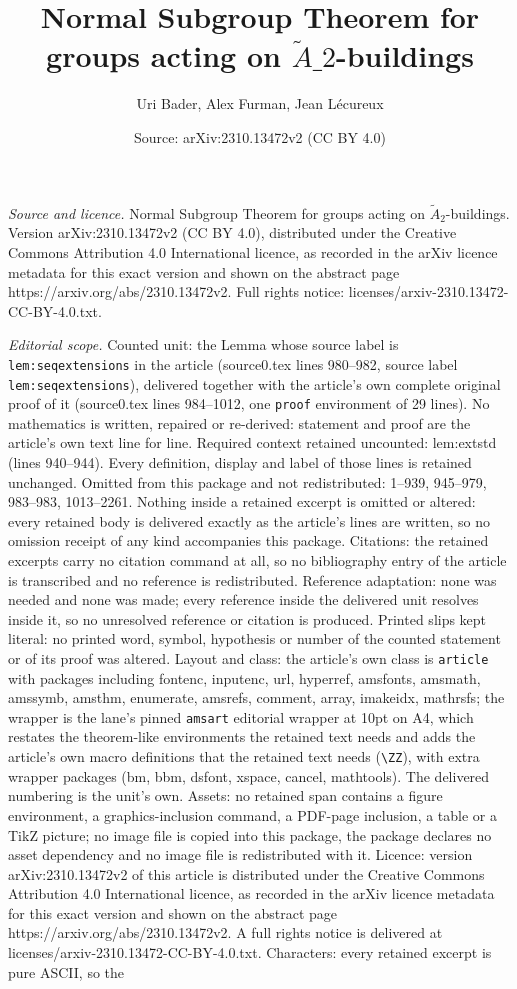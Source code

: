 \documentclass[10pt,a4paper]{amsart}
\title[Normal Subgroup Theorem for groups acting on $\tilde A\_2$-bu]{Normal Subgroup Theorem for groups acting on $\tilde A\_2$-buildings}
\author{Uri Bader, Alex Furman, Jean L\'ecureux}
\date{Source: arXiv:2310.13472v2 (CC BY 4.0)}
\begin{document}
\maketitle

\noindent\emph{Source and licence.} Normal Subgroup Theorem for groups acting on $\tilde A_2$-buildings. Version arXiv:2310.13472v2 (CC BY 4.0), distributed under the Creative Commons Attribution 4.0 International licence, as recorded in the arXiv licence metadata for this exact version and shown on the abstract page https://arxiv.org/abs/2310.13472v2. Full rights notice: licenses/arxiv-2310.13472-CC-BY-4.0.txt.\par\smallskip

\noindent\textit{Editorial scope.} Counted unit: the Lemma whose source label is \texttt{lem:seqextensions} in the article (source0.tex lines 980--982, source label \texttt{lem:seqextensions}), delivered together with the article's own complete original proof of it (source0.tex lines 984--1012, one \texttt{proof} environment of 29 lines). No mathematics is written, repaired or re-derived: statement and proof are the article's own text line for line. Required context retained uncounted: lem:extstd (lines 940--944). Every definition, display and label of those lines is retained unchanged. Omitted from this package and not redistributed: 1--939, 945--979, 983--983, 1013--2261. Nothing inside a retained excerpt is omitted or altered: every retained body is delivered exactly as the article's lines are written, so no omission receipt of any kind accompanies this package. Citations: the retained excerpts carry no citation command at all, so no bibliography entry of the article is transcribed and no reference is redistributed. Reference adaptation: none was needed and none was made; every reference inside the delivered unit resolves inside it, so no unresolved reference or citation is produced. Printed slips kept literal: no printed word, symbol, hypothesis or number of the counted statement or of its proof was altered. Layout and class: the article's own class is \texttt{article} with packages including fontenc, inputenc, url, hyperref, amsfonts, amsmath, amssymb, amsthm, enumerate, amsrefs, comment, array, imakeidx, mathrsfs; the wrapper is the lane's pinned \texttt{amsart} editorial wrapper at 10pt on A4, which restates the theorem-like environments the retained text needs and adds the article's own macro definitions that the retained text needs (\texttt{\textbackslash ZZ}), with extra wrapper packages (bm, bbm, dsfont, xspace, cancel, mathtools). The delivered numbering is the unit's own. Assets: no retained span contains a figure environment, a graphics-inclusion command, a PDF-page inclusion, a table or a TikZ picture; no image file is copied into this package, the package declares no asset dependency and no image file is redistributed with it. Licence: version arXiv:2310.13472v2 of this article is distributed under the Creative Commons Attribution 4.0 International licence, as recorded in the arXiv licence metadata for this exact version and shown on the abstract page https://arxiv.org/abs/2310.13472v2. A full rights notice is delivered at licenses/arxiv-2310.13472-CC-BY-4.0.txt. Characters: every retained excerpt is pure ASCII, so the 
\end{document}
